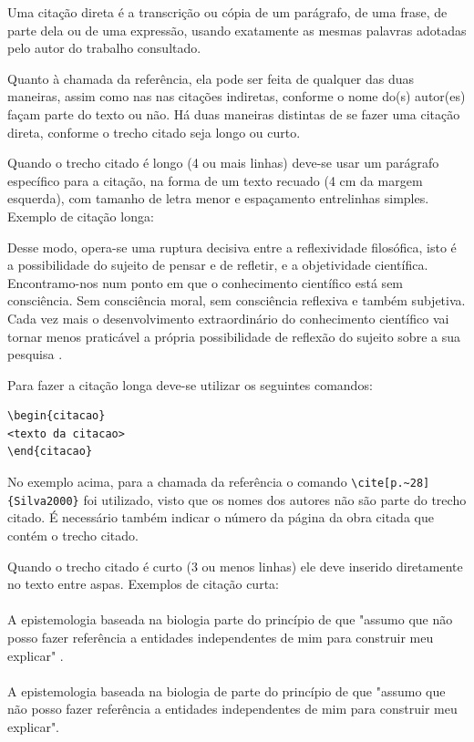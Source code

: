 Uma citação direta é a transcrição ou cópia de um parágrafo, de uma frase, de parte dela ou de uma expressão, usando exatamente as mesmas palavras adotadas pelo autor do trabalho consultado.

Quanto à chamada da referência, ela pode ser feita de qualquer das duas maneiras, assim como nas nas citações indiretas, conforme o nome do(s) autor(es) façam parte do texto ou não. Há duas maneiras distintas de se fazer uma citação direta, conforme o trecho citado seja longo ou curto.

Quando o trecho citado é longo (4 ou mais linhas) deve-se usar um parágrafo específico para a citação, na forma de um texto recuado (4 cm da margem esquerda), com tamanho de letra menor e espaçamento entrelinhas simples. Exemplo de citação longa:
\\\begin{citacao}
Desse modo, opera-se uma ruptura decisiva entre a reflexividade filosófica, isto é a possibilidade do sujeito de pensar e de refletir, e a objetividade científica. Encontramo-nos num ponto em que o conhecimento científico está sem consciência. Sem consciência moral, sem consciência reflexiva e também subjetiva. Cada vez mais o desenvolvimento extraordinário do conhecimento científico vai tornar menos praticável a própria possibilidade de reflexão do sujeito sobre a sua pesquisa \cite[p.~28]{Silva2000}.
\end{citacao}

Para fazer a citação longa deve-se utilizar os seguintes comandos:
\begin{verbatim}
\begin{citacao}
<texto da citacao>
\end{citacao}
\end{verbatim}

No exemplo acima, para a chamada da referência o comando \verb|\cite[p.~28]{Silva2000}| foi utilizado, visto que os nomes dos autores não são parte do trecho citado. É necessário também indicar o número da página da obra citada que contém o trecho citado.

Quando o trecho citado é curto (3 ou menos linhas) ele deve inserido diretamente no texto entre aspas. Exemplos de citação curta:\\
\\A epistemologia baseada na biologia parte do princípio de que "assumo que não posso fazer referência a entidades independentes de mim para construir meu explicar" \cite[p.~35]{Maturana2003}.\\
\\A epistemologia baseada na biologia de  parte do princípio de que "assumo que não posso fazer referência a entidades independentes de mim para construir meu explicar".\\

